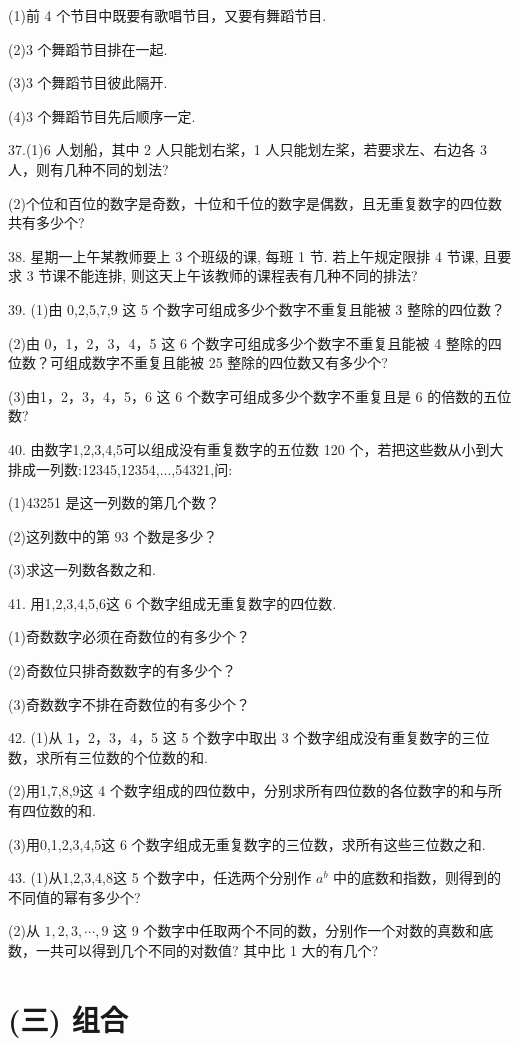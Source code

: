\documentclass[10pt]{article}
\begin{document}
(1)前 4 个节目中既要有歌唱节目，又要有舞蹈节目.

(2)3 个舞蹈节目排在一起.

(3)3 个舞蹈节目彼此隔开.

(4)3 个舞蹈节目先后顺序一定.

37.(1)6 人划船，其中 2 人只能划右桨，1 人只能划左桨，若要求左、右边各 3 人，则有几种不同的划法?

(2)个位和百位的数字是奇数，十位和千位的数字是偶数，且无重复数字的四位数共有多少个?

38. 星期一上午某教师要上 3 个班级的课, 每班 1 节. 若上午规定限排 4 节课, 且要求 3 节课不能连排, 则这天上午该教师的课程表有几种不同的排法?

39. (1)由 0,2,5,7,9 这 5 个数字可组成多少个数字不重复且能被 3 整除的四位数？

(2)由 0，1，2，3，4，5 这 6 个数字可组成多少个数字不重复且能被 4 整除的四位数？可组成数字不重复且能被 25 整除的四位数又有多少个?

(3)由1，2，3，4，5，6 这 6 个数字可组成多少个数字不重复且是 6 的倍数的五位数?

40. 由数字1,2,3,4,5可以组成没有重复数字的五位数 120 个，若把这些数从小到大排成一列数:12345,12354,...,54321,问:

(1)43251 是这一列数的第几个数？

(2)这列数中的第 93 个数是多少？

(3)求这一列数各数之和.

41. 用1,2,3,4,5,6这 6 个数字组成无重复数字的四位数.

(1)奇数数字必须在奇数位的有多少个？

(2)奇数位只排奇数数字的有多少个？

(3)奇数数字不排在奇数位的有多少个？

42. (1)从 1，2，3，4，5 这 5 个数字中取出 3 个数字组成没有重复数字的三位数，求所有三位数的个位数的和.

(2)用1,7,8,9这 4 个数字组成的四位数中，分别求所有四位数的各位数字的和与所有四位数的和.

(3)用0,1,2,3,4,5这 6 个数字组成无重复数字的三位数，求所有这些三位数之和.

43. (1)从1,2,3,4,8这 5 个数字中，任选两个分别作 \({a}^{b}\) 中的底数和指数，则得到的不同值的幂有多少个?

(2)从 \(1,2,3,\cdots ,9\) 这 9 个数字中任取两个不同的数，分别作一个对数的真数和底数，一共可以得到几个不同的对数值? 其中比 1 大的有几个?

\section*{(三) 组合}
\end{document}
